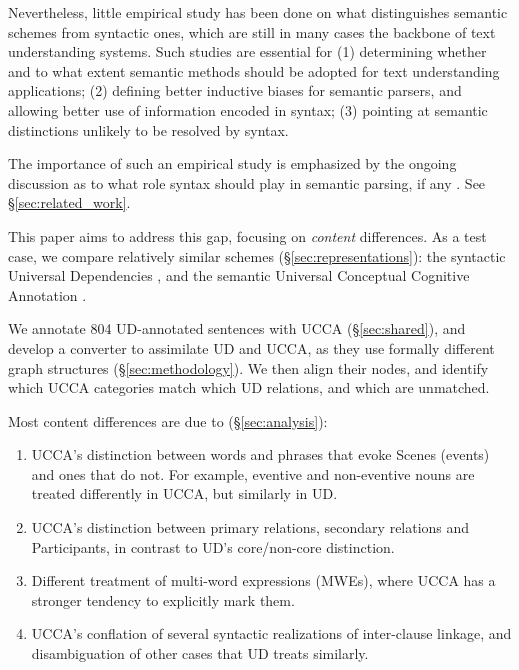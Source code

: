 \documentclass[11pt,a4paper]{article}
\begin{document}
  Nevertheless, little empirical study has been done on what distinguishes semantic schemes from
  syntactic ones, which are still in many cases the backbone of text understanding systems. 
  Such studies are essential for 
  (1) determining whether and to what extent semantic methods should be adopted for text understanding applications;
  (2) defining better inductive biases for semantic parsers, and allowing better use of information encoded in syntax;
  (3) pointing at semantic distinctions unlikely to be resolved by syntax.

  The importance of such an empirical study is emphasized by the ongoing discussion as to what role syntax should
  play in semantic parsing, if any \cite{swayamdipta2018syntactic,strubell2018linguistically,P18-1192,C18-1233}.
  See \S\ref{sec:related_work}.

  This paper aims to address this gap,
  focusing on {\it content} differences.
  As a test case, we compare relatively similar schemes (\S\ref{sec:representations}):
  the syntactic Universal Dependencies \cite[UD; ][]{nivre2016universal},
  and the semantic Universal Conceptual Cognitive Annotation \cite[UCCA; ][]{abend2013universal}.
  
  We annotate 804 UD-annotated sentences with UCCA (\S\ref{sec:shared}),
  and develop a converter to assimilate UD and UCCA,
  as they use formally different graph structures
  (\S\ref{sec:methodology}).
  We then align their nodes, and identify which UCCA categories match which UD relations,
  and which are unmatched.

  Most content differences are due to (\S\ref{sec:analysis}):
  \begin{enumerate}[itemsep=0.159mm,leftmargin=5.95mm]
      \item UCCA's distinction between words and phrases that evoke Scenes (events) and ones that do not.
        For example, eventive and non-eventive nouns are treated differently in UCCA, but similarly in UD.
      \item UCCA's distinction between primary relations, secondary relations
        and Participants, in contrast to UD's core/non-core distinction. %
      \item Different treatment of multi-word expressions (MWEs),
        where UCCA has a stronger tendency to explicitly mark them. %
      \item UCCA's conflation of several syntactic realizations of inter-clause linkage,
        and disambiguation of other cases that UD treats similarly.
   \end{enumerate}
\end{document}
